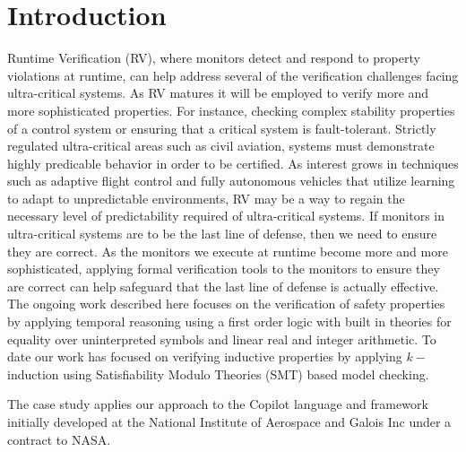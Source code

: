 \section{Introduction}\label{sec:intro}
Runtime Verification (RV), where monitors detect and respond to
property violations at runtime, can help address several of the
verification challenges facing ultra-critical systems.  As RV matures
it will be employed to verify more and more sophisticated
properties. For instance, checking complex stability properties of a
control system or ensuring that a critical system is fault-tolerant.
Strictly regulated ultra-critical areas such as civil aviation,
systems must demonstrate highly predicable behavior in order to be
certified. As interest grows in techniques such as adaptive flight
control and fully autonomous vehicles that utilize learning to adapt
to unpredictable environments, RV may be a way to regain the necessary
level of predictability required of ultra-critical systems.  If
monitors in ultra-critical systems are to be the last line of defense,
then we need to ensure they are correct.  As the monitors we execute
at runtime become more and more sophisticated, applying formal
verification tools to the monitors to ensure they are correct can help
safeguard that the last line of defense is actually effective. The
ongoing work described here focuses on the verification of safety
properties by applying temporal reasoning using a first order logic
with built in theories for equality over uninterpreted symbols and
linear real and integer arithmetic. To date our work has focused on
verifying inductive properties by applying $k-$induction using
Satisfiability Modulo Theories (SMT) based model checking. 

The case study applies our approach to the Copilot language and
 framework initially developed at the National Institute of Aerospace
 and Galois Inc under a contract to NASA.  


  








